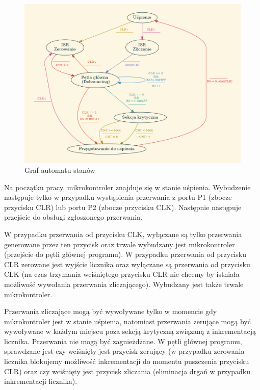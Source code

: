 \documentclass[fleqn]{article}
\begin{document}
\begin{figure}[H]
	\centering
	\includegraphics[width=\textwidth]{assets/graph.png}
	\caption{Graf automatu stanów}
	\label{fig:graph}
\end{figure}



Na początku pracy, mikrokontroler znajduje się w stanie uśpienia. Wybudzenie następuje tylko w przypadku wystąpienia przerwania z portu P1 (zbocze przycisku CLR) lub portu P2 (zbocze przycisku CLK). Następnie następuje przejście do obsługi zgłoszonego przerwania.

W przypadku przerwania od przycisku CLK, wyłączane są tylko przerwania generowane przez ten przycisk oraz trwale wybudzany jest mikrokontroler (przejście do pętli głównej programu). W przypadku przerwania od przycisku CLR zerowane jest wyjście licznika oraz wyłączane są przerwania od przycisku CLK (na czas trzymania wciśniętego przycisku CLR nie chcemy by istniała możliwość wywołania przerwania zliczającego). Wybudzany jest także trwale mikrokontroler.

Przerwania zliczające mogą być wywoływane tylko w momencie gdy mikrokontroler jest w stanie uśpienia, natomiast przerwania zerujące mogą być wywoływane w każdym miejscu poza sekcją krytyczną związaną z inkrementacją licznika. Przerwania nie mogą być zagnieżdżane. W pętli głównej programu, sprawdzane jest czy wciśnięty jest przycisk zerujący (w przypadku zerowania licznika blokujemy możliwość inkrementacji do momentu puszczenia przycisku CLR) oraz czy wciśnięty jest przycisk zliczania (eliminacja drgań w przypadku inkrementacji licznika).
\end{document}
